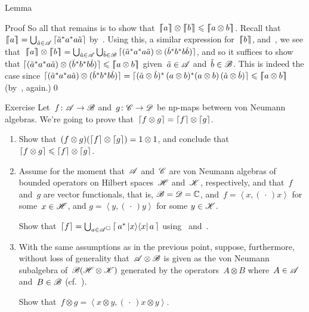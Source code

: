\documentclass[a]{subfiles}
\begin{document}
\begin{parsec}
\begin{point}{Lemma}
\begin{point}{Proof}
So all that remains is to show that~$\cceil{a}\otimes\cceil{b}
\leq \cceil{a\otimes b}$.
Recall that~$\left\lceil\!\!\left\lceil a\right\rceil\!\!\right\rceil= \bigcup_{\tilde{a}\in\mathscr{A}}
\left\lceil\tilde{a}^* a^*a\tilde{a}\right\rceil$
by~.
Using this,  a similar
expression for~$\left\lceil\!\!\left\lceil b\right\rceil\!\!\right\rceil$,
and~,
we see that~$\cceil{a}\otimes \cceil{b}
=\bigcup_{\tilde{a}\in\scrA}
\bigcup_{\tilde{b}\in\scrB}
\ceil{ \smash{(\tilde{a}^*a^*a\tilde{a})
\otimes (\tilde{b}^*b^*b\tilde{b})} }$,
and so it suffices to show that 
$\left\lceil\smash{(\tilde{a}^*a^*a\tilde{a})
\otimes (\tilde{b}^*b^*b \tilde{b})}\right\rceil
\leqslant \left\lceil\!\!\left\lceil a\otimes b\right\rceil\!\!\right\rceil$
given~$\tilde{a}\in\mathscr{A}$
and~$\tilde{b}\in\mathscr{B}$.
This is indeed the case
since
$\left\lceil\smash{(\tilde{a}^*a^*a\tilde{a})
\otimes (\tilde{b}^*b^*b \tilde{b})}\right\rceil 
=
\left\lceil\smash{(\tilde{a}\otimes\tilde{b})^*\,
	(a \otimes b)^*(a\otimes b) \,
(\tilde{a}\otimes \tilde{b})}\right\rceil
\leqslant \left\lceil\!\!\left\lceil a\otimes b\right\rceil\!\!\right\rceil$
(by~, again.)\qed
\end{point}
\end{point}
\begin{point}{Exercise}%
Let~$f\colon \mathscr{A}\to\mathscr{B}$
and~$g\colon \mathscr{C}\to\mathscr{D}$ be np-maps
between von Neumann algebras.
We're going to prove that~$\left\lceil f\otimes g\right\rceil
=\left\lceil f\right\rceil\otimes \left\lceil g\right\rceil$.
\begin{enumerate}
\item
Show that~$(f\otimes g)(\left\lceil f\right\rceil\otimes\left\lceil g\right\rceil)=1\otimes 1$,
and conclude that~$\left\lceil f\otimes g\right\rceil \leqslant\left\lceil f\right\rceil\otimes\left\lceil g\right\rceil$.
\item
Assume for the moment that~$\mathscr{A}$
and~$\mathscr{C}$ are von Neumann algebras
of bounded operators on Hilbert spaces~$\mathscr{H}$
and~$\mathscr{K}$, respectively,
and that~$f$ and~$g$ are vector functionals,
that is, $\mathscr{B}=\mathscr{D}=\mathbb{C}$,
and~$f=\left<x,(\,\cdot\,)x\right>$
for some~$x\in\mathscr{H}$,
and
$g=\left<y,(\,\cdot\,)y\right>$
for some
$y\in \mathscr{K}$.

Show that~$\left\lceil f\right\rceil=\bigcup_{a\in\mathscr{A}^\square}
\left\lceil\,a^* \left|x\right>\!\left<x\right| a\,\right\rceil$
using~
and~.

\item
With the same assumptions as in the previous
point,
suppose, furthermore, without loss of generality
that~$\mathscr{A}\otimes \mathscr{B}$
is
given as the von Neumann subalgebra of~$\mathscr{B}(\mathscr{H}\otimes \mathscr{K})$
generated by the operators~$A\otimes B$
where~$A\in\mathscr{A}$ and~$B\in\mathscr{B}$
(cf.~).

Show that~$f\otimes g = \left<x\otimes y,(\,\cdot\,)x\otimes y\right>$.


\end{enumerate}
\end{point}
\end{parsec}
\end{document}
